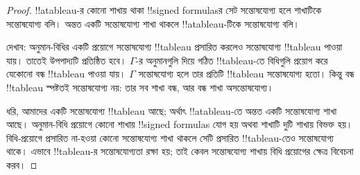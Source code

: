 \documentclass[../../../include/open-logic-section]{subfiles}
\begin{document}
\begin{proof}
!!a{tableau}-র কোনো শাখায় থাকা !!{signed formula}sর
সেট সন্তোষযোগ্য হলে শাখাটিকে সন্তোষযোগ্য বলি। অন্তত একটি
সন্তোষযোগ্য শাখা থাকলে !!a{tableau}-টিকে সন্তোষযোগ্য বলি।

দেখাব: অনুমান-বিধির একটি প্রয়োগে সন্তোষযোগ্য
!!{tableau} প্রসারিত করলেও সন্তোষযোগ্য !!{tableau} পাওয়া যায়।
তাতেই উপপাদ্যটি প্রতিষ্ঠিত হবে। $\Gamma$-র অনুমানগুলি
দিয়ে গঠিত !!{tableau}-তে বিধিগুলি প্রয়োগ করে যেকোনো বন্ধ
!!{tableau} পাওয়া যায়। $\Gamma$ সন্তোষযোগ্য হলে তার
প্রতিটি !!{tableau} সন্তোষযোগ্য হতো। কিন্তু বন্ধ
!!{tableau} স্পষ্টতই সন্তোষযোগ্য নয়: তার সব শাখা বন্ধ,
আর বন্ধ শাখা অসন্তোষযোগ্য।

ধরি, আমাদের একটি সন্তোষযোগ্য !!{tableau} আছে; অর্থাৎ
!!a{tableau}-তে অন্তত একটি সন্তোষযোগ্য শাখা আছে।
অনুমান-বিধি প্রয়োগে কোনো শাখায় !!{signed formula}s
যোগ হয় অথবা শাখাটি দুটি শাখায় বিভক্ত হয়। বিধি-প্রয়োগে
প্রসারিত না-হওয়া কোনো সন্তোষযোগ্য শাখা থাকলে সেটি
প্রসারিত !!{tableau}-তেও সন্তোষযোগ্য থাকে। এভাবে
!!{tableau}-র সন্তোষযোগ্যতা রক্ষা হয়; তাই কেবল
সন্তোষযোগ্য শাখায় বিধি প্রয়োগের ক্ষেত্র বিবেচনা করব।


\end{proof}
\end{document}
